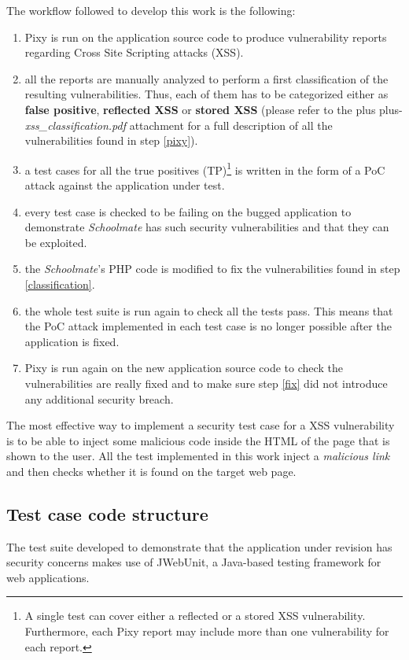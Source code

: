 \documentclass{sig-alternate-05-2015}
\newcommand\lword[1]{\leavevmode\nobreak\hskip0pt plus\linewidth\penalty50\hskip0pt plus-\linewidth\nobreak#1}
\begin{document}
The workflow followed to develop this work is the following:
\begin{enumerate}
    \item \label{pixy} Pixy is run on the application source code to produce vulnerability reports
        regarding Cross Site Scripting attacks (XSS).
    \item \label{classification} all the reports are manually analyzed to perform a first
        classification of the resulting vulnerabilities. Thus, each of them has to be
        categorized either as \textbf{false positive}, \textbf{reflected XSS} or
        \textbf{stored XSS} (please refer to the \lword{\emph{xss\_classification.pdf}}
        attachment for a full description of all the vulnerabilities found in step \ref{pixy}).
    \item a test cases for all the true positives (TP)\footnote{A single test can cover
        either a reflected or a stored XSS vulnerability. Furthermore, each Pixy report may
        include more than one vulnerability for each report.} is written in the form
        of a PoC attack against the application under test.
    \item every test case is checked to be failing on the bugged application to demonstrate
        \emph{Schoolmate} has such security vulnerabilities and that they can be exploited.
    \item \label{fix} the \emph{Schoolmate}'s PHP code is modified to fix the vulnerabilities
        found in step \ref{classification}.
    \item the whole test suite is run again to check all the tests pass. This means that
        the PoC attack implemented in each test case is no longer possible after the application
        is fixed.
    \item Pixy is run again on the new application source code to check the
        vulnerabilities are really fixed and to make sure step \ref{fix} did not
        introduce any additional security breach.
\end{enumerate}

The most effective way to implement a security test case for a XSS vulnerability is to
be able to inject some malicious code inside the HTML of the page that is shown to the user.
All the test implemented in this work inject a \emph{malicious link} and then checks
whether it is found on the target web page.

\subsection{Test case code structure}
The test suite developed to demonstrate that the application under revision has
security concerns makes use of JWebUnit, a Java-based testing framework for web
applications.
\end{document}
